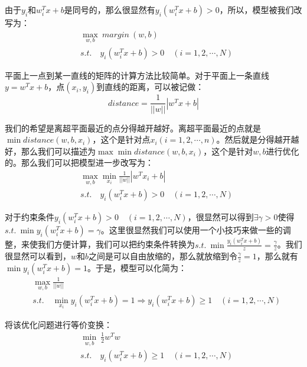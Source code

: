 \documentclass[a4paper]{article}
\begin{document}
由于$y_i$和$w^T_ix+b$是同号的，那么很显然有$y_i(w^T_ix+b)>0$，所以，模型被我们改写为：
\begin{equation}
    \begin{split}
        & \max_{w,b} \ margin\ (w,b) \\
        & s.t.\quad y_i(w^T_ix+b)>0 \quad (i = 1,2,\cdots,N)
    \end{split}
\end{equation}

平面上一点到某一直线的矩阵的计算方法比较简单。对于平面上一条直线$y=w^Tx+b$，点$(x_i,y_i)$到直线的距离，可以被记做：
\begin{equation}
    distance = \frac{1}{||w||}|w^Tx+b|
\end{equation}

我们的希望是离超平面最近的点分得越开越好。离超平面最近的点就是$\min distance(w,b,x_i)$，这个是针对点$x_i (i=1,2,\cdots,n)$。然后就是分得越开越好，那么我们可以描述为$\max \min distance(w,b,x_i)$，这个是针对$w,b$进行优化的。那么我们可以把模型进一步改写为：
\begin{equation}
    \begin{split}
        & \max_{w,b} \min_{x_i} \frac{1}{||w||}|w^Tx_i+b| \\
        & s.t.\quad y_i(w^T_ix+b)>0 \quad (i = 1,2,\cdots,N)
    \end{split}
\end{equation}

对于约束条件$y_i(w^T_ix+b)>0 \quad (i = 1,2,\cdots,N)$，很显然可以得到$\exists \gamma > 0$使得$s.t.\ \min y_i(w^T_ix+b)=\gamma$。这里很显然我们可以使用一个小技巧来做一些的调整，来使我们方便计算，我们可以把约束条件转换为$s.t.\ \min \frac{y_i(w^T_ix+b)}{z}=\frac{\gamma}{z}$。我们很显然可以看到，$w$和$b$之间是可以自由放缩的，那么就放缩到令$\frac{\gamma}{z}=1$，那么就有$\min y_i(w^T_ix+b)=1$。于是，模型可以化简为：
\begin{equation}
    \begin{split}
        & \max_{w,b} \frac{1}{||w||} \\
        & s.t.\quad \min_{x_i} y_i(w^T_ix+b)=1 \Longrightarrow y_i(w^T_ix+b)\geq 1 \quad (i = 1,2,\cdots,N)
    \end{split}
\end{equation}

将该优化问题进行等价变换：
\begin{equation}
    \begin{split}
        & \min_{w,b} \ \frac{1}{2} w^Tw \\
        & s.t. \quad y_i(w^T_ix+b)\geq 1 \quad (i = 1,2,\cdots,N)
    \end{split}
\end{equation}
\end{document}
